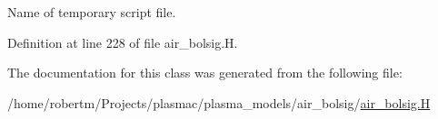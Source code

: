 Name of temporary script file. 



Definition at line 228 of file air\+\_\+bolsig.\+H.



The documentation for this class was generated from the following file\+:\begin{DoxyCompactItemize}
\item 
/home/robertm/\+Projects/plasmac/plasma\+\_\+models/air\+\_\+bolsig/\hyperlink{air__bolsig_8H}{air\+\_\+bolsig.\+H}\end{DoxyCompactItemize}
